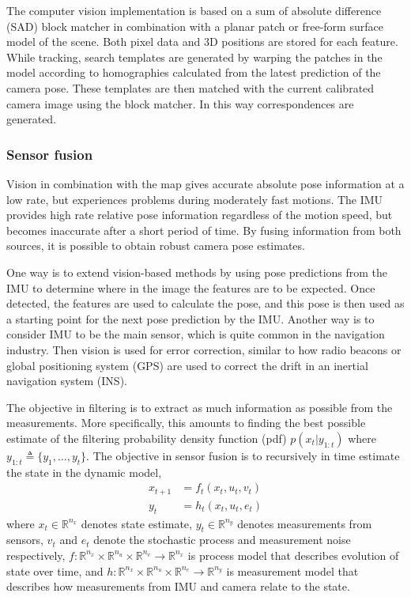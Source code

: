The computer vision implementation is based on a sum of absolute difference (SAD) block matcher in combination with a planar patch or free-form surface model of the scene. Both pixel data and 3D positions are stored for each feature. While tracking, search templates are generated by warping the patches in the model according to homographies calculated from the latest prediction of the camera pose. These templates are then matched with the current calibrated camera image using the block matcher. In this way correspondences are generated.


\subsubsection{Sensor fusion}

Vision in combination with the map gives accurate absolute pose information at a low rate, but experiences problems during moderately fast motions. The IMU provides high rate relative pose information regardless of the motion speed, but becomes inaccurate after a short period of time. By fusing information from both sources, it is possible to obtain robust camera pose estimates.

One way is to extend vision-based methods by using pose predictions from the IMU to determine where in the image the features are to be expected. Once detected, the features are used to calculate the pose, and this pose is then used as a starting point for the next pose prediction by the IMU. Another way is to consider IMU to be the main sensor, which is quite common in the navigation industry. Then vision is used for error correction, similar to how radio beacons or global positioning system (GPS) are used to correct the drift in an inertial navigation system (INS). 

The objective in filtering is to extract as much information as possible from the measurements. More specifically, this amounts to finding the best possible estimate of the filtering probability density function (pdf) $ p( x_{t} | y_{1:t} ) $ where $ y_{1:t} \triangleq %
\{ y_{1}, \ldots, y_{t} \} $. The objective in sensor fusion is to recursively in time estimate the state in the dynamic model,
\begin{subequations} \label{eq:fusion} \begin{align}
	x_{t+1} &= f_{t} ( x_{t} ,u_{t} , v_{t} )\\
	y_{t} &= h_{t} ( x_{t} ,u_{t} , e_{t} )
\end{align} \end{subequations}
where $ x_{t} \in \mathbb{R}^{n_{x}} $ denotes state estimate, $ y_{t} \in \mathbb{R}^{n_{y}} $ denotes  measurements from sensors, $ v_{t} $ and $ e_{t} $ denote the stochastic process and measurement noise respectively, $ f : \mathbb{R}^{n_{x}} \times \mathbb{R}^{n_{u}} \times \mathbb{R}^{n_{v}} \rightarrow \mathbb{R}^{n_{x}} $ is process model that describes evolution of state over time, and $ h : \mathbb{R}^{n_{x}} \times \mathbb{R}^{n_{u}} \times \mathbb{R}^{n_{e}} \rightarrow \mathbb{R}^{n_{y}} $ is measurement model that describes how measurements from IMU and  camera relate to the state.  

